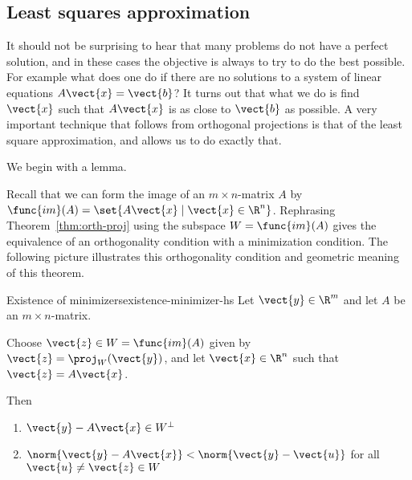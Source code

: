 \subsection{Least squares approximation}

It should not be surprising to hear that many problems do not have a
perfect solution, and in these cases the objective is always to try to
do the best possible. For example what does one do if there are no
solutions to a system of linear equations $A\vect{x}=\vect{b}$? It
turns out that what we do is find $\vect{x}$ such that $A\vect{x}$ is
as close to $\vect{b}$ as possible. A very important technique that
follows from orthogonal projections is that of the least square
approximation, and allows us to do
exactly that.

We begin with a lemma. 

Recall that we can form the image of an $m \times n$-matrix $A$ by
$\func{im}(A) = \set{A\vect{x} \mid \vect{x} \in
\R^n }$. Rephrasing Theorem~\ref{thm:orth-proj} using
the subspace $W=\func{im}(A)$  gives the
equivalence of an orthogonality condition with a minimization
condition. The following picture
illustrates this orthogonality condition and geometric meaning of this
theorem.

\begin{center}
\end{center}

\begin{theorem}{Existence of minimizers}{existence-minimizer-hs}\label{existence-minimizer-hs}
Let $\vect{y}\in \R^{m}$ and let $A$ be an $m\times n$-matrix.

Choose $\vect{z}\in W= \func{im}(A)$ given by $\vect{z} =
\proj_{W}(\vect{y})$, and let $\vect{x} \in \R^{n}$ such that $\vect{z}=A\vect{x}$.

Then
\begin{enumerate}
\item $\vect{y} - A\vect{x} \in W^{\perp}$
\item $\norm{\vect{y} - A\vect{x}} < \norm{\vect{y} - \vect{u}}$ for all $\vect{u} \neq \vect{z} \in W$
\end{enumerate}
\end{theorem}

